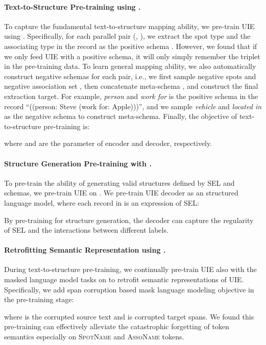 \documentclass[11pt]{article}
\begin{document}
\paragraph{Text-to-Structure Pre-training using .}
To capture the fundamental text-to-structure mapping ability, we pre-train UIE using .
Specifically, for each parallel pair (, ), we extract the spot type  and the associating type  in the record  as the positive schema .
However, we found that if we only feed UIE with a positive schema, it will only simply remember the triplet in the pre-training data.
To learn general mapping ability, we also automatically construct negative schemas for each pair, i.e., we first sample negative spots  and negative association set , then concatenate meta-schema , and construct the final extraction target.
For example, \textit{person} and \textit{work for} is the positive schema in the record ``((person: Steve (work for: Apple)))'', and we sample \textit{vehicle} and \textit{located in} as the negative schema to construct meta-schema.
Finally, the objective of  text-to-structure pre-training is:

where  and  are the parameter of encoder and decoder, respectively.


\paragraph{Structure Generation Pre-training with .}

To pre-train the ability of generating valid structures defined by SEL and schemas, we pre-train UIE on .
We pre-train UIE decoder as an structured language model, where each record in  is an expression of SEL:

By pre-training for structure generation, the decoder can capture the regularity of SEL and the interactions between different labels.

\paragraph{Retrofitting Semantic Representation using .}

During text-to-structure pre-training, we continually pre-train UIE also with the masked language model tasks \citep{2020t5} on  to retrofit semantic representations of UIE.
Specifically, we add span corruption based mask language modeling objective in the pre-training stage:

where  is the corrupted source text and  is corrupted target spans.
We found this pre-training can effectively alleviate the catastrophic forgetting of token semantics especially on \textsc{SpotName} and \textsc{AssoName} tokens.
\end{document}
